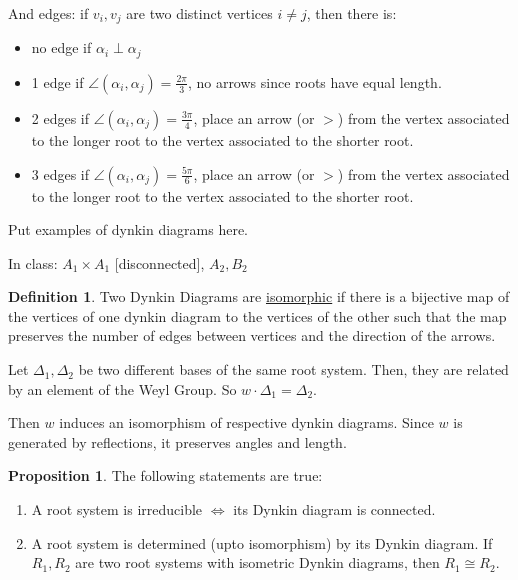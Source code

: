 \documentclass{article}
\theoremstyle{definition}
\newtheorem{definition}{Definition}
\newtheorem{proposition}{Proposition}
\begin{document}
And edges: if \(v_i, v_j\) are two distinct vertices \(i \neq j\), then there is:

\begin{itemize}
    \item no edge if \(\alpha_i\perp \alpha_j\)
    \item 1 edge if \(\angle(\alpha_i,\alpha_j)=\frac{2\pi}{3}\), no arrows since roots have equal length.
    \item 2 edges if \(\angle(\alpha_i,\alpha_j)=\frac{3\pi}{4}\), place an arrow (or \(>\)) from the vertex associated to the longer root to the vertex associated to the shorter root.
    \item 3 edges if \(\angle(\alpha_i,\alpha_j)=\frac{5\pi}{6}\), place an arrow (or \(>\)) from the vertex associated to the longer root to the vertex associated to the shorter root. 
\end{itemize}

Put examples of dynkin diagrams here.

In class: \(A_1\times A_1\) [disconnected], \(A_2, B_2\)

\begin{definition}
    Two Dynkin Diagrams are \underline{isomorphic} if there is a bijective map of the vertices of one dynkin diagram to the vertices of the other such that the map preserves the number of edges between vertices and the direction of the arrows.
\end{definition}

Let \(\Delta_1,\Delta_2\) be two different bases of the same root system. Then, they are related by an element of the Weyl Group. So \(w\cdot \Delta_1 = \Delta_2\).

Then \(w\) induces an isomorphism of respective dynkin diagrams. Since \(w\) is generated by reflections, it preserves angles and length.

\begin{proposition}
    The following statements are true:

    \begin{enumerate}
        \item A root system is irreducible \(\iff\) its Dynkin diagram is connected.
        \item A root system is determined (upto isomorphism) by its Dynkin diagram. If \(R_1,R_2\) are two root systems with isometric Dynkin diagrams, then \(R_1\cong R_2\).
    \end{enumerate}
\end{proposition}
\end{document}

